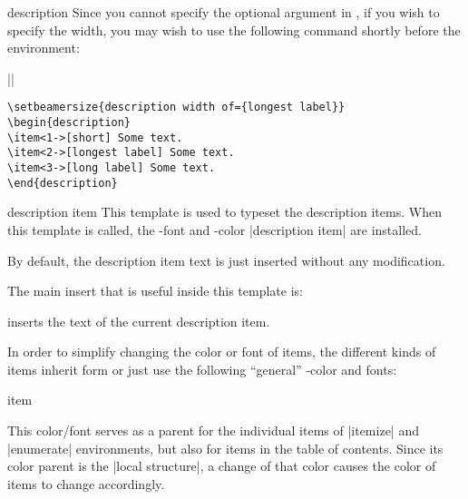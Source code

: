 \begin{environment}{{description}}
  \lyxnote
  Since you cannot specify the optional argument in \LyX, if you wish
  to specify the width, you may wish to use the following command
  shortly before the environment:

  ||

  \example
\begin{verbatim}
\setbeamersize{description width of={longest label}}
\begin{description}
\item<1->[short] Some text.
\item<2->[longest label] Some text.
\item<3->[long label] Some text.
\end{description}
\end{verbatim}
  
  \begin{element}{description item}\yes\yes\yes
    This template is used to typeset the description items. When this
    template is called, the \beamer-font and -color |description item|
    are installed.
    
    \begin{templateoptions}
      By default, the description item text is just inserted without
      any modification.
    \end{templateoptions}

    The main insert that is useful inside this template is:
    \begin{templateinserts}
      \iteminsert{\insertdescriptionitem} inserts the text of the
      current description item.
    \end{templateinserts}
  \end{element}
\end{environment}



In order to simplify changing the color or font of items, the
different kinds of items inherit form or just use the following
``general'' \beamer-color and fonts:

\begin{element}{item}\no\yes\yes

  This color/font serves as a parent for the individual items of
  |itemize| and |enumerate| environments, but also for items in the
  table of contents. Since its color parent is the |local structure|,
  a change of that color causes the color of items to change
  accordingly.
\end{element}

